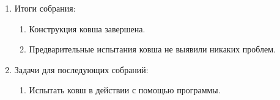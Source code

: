 \begin{enumerate}
\begin{enumerate}
		
	\end{enumerate}
	
	\item Итоги собрания:
	\begin{enumerate}
		\item Конструкция ковша завершена.
		
		\item Предварительные испытания ковша не выявили никаких проблем.
		
	\end{enumerate}
	
	\item Задачи для последующих собраний:
	\begin{enumerate}
		\item Испытать ковш в действии с помощью программы.
		
	\end{enumerate}     
\end{enumerate}

\fillpage

